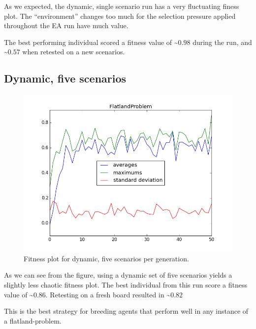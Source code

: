 \documentclass[twoside]{article}
\begin{document}
\begin{multicols}{2}
  As we expected, the dynamic, single scenario run has a very fluctuating finess plot.
  The ``environment'' changes too much for the selection pressure applied throughout the EA run have much value.

  The best performing individual scored a fitness value of \textasciitilde $0.98$ during the run, and \textasciitilde $0.57$ when retested on a new scenarios.

  \subsection{Dynamic, five scenarios}
  
  \begin{figure}[H]
    \centering
    \includegraphics[width=\linewidth]{images/dynamic_5.png}
    \caption{Fitness plot for dynamic, five scenarios per generation.} \label{fig:static-single}
  \end{figure}

  As we can see from the figure, using a dynamic set of five scenarios yields a slightly less chaotic fitness plot.
  The best individual from this run score a fitness value of \textasciitilde $0.86$.
  Retesting on a fresh board resulted in \textasciitilde $0.82$

  This is the best strategy for breeding agents that perform well in any instance of a flatland-problem.

\end{multicols}

%
%
\end{document}
